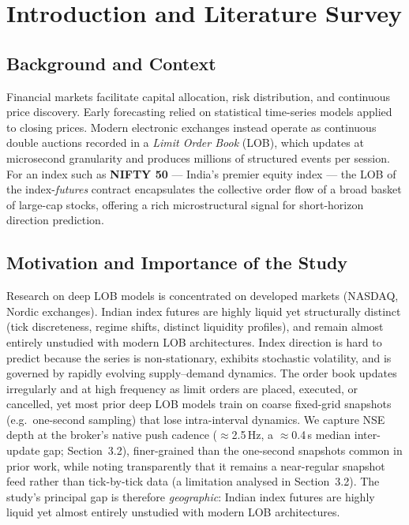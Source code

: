 \documentclass[11pt]{article}
\begin{document}
\section{Introduction and Literature Survey}

\subsection{Background and Context}
Financial markets facilitate capital allocation, risk distribution, and continuous price discovery.
Early forecasting relied on statistical time-series models applied to closing prices. Modern electronic
exchanges instead operate as continuous double auctions recorded in a \emph{Limit Order Book} (LOB),
which updates at microsecond granularity and produces millions of structured events per session. For an
index such as \textbf{NIFTY 50} --- India's premier equity index --- the LOB of the index-\emph{futures}
contract encapsulates the collective order flow of a broad basket of large-cap stocks, offering a rich
microstructural signal for short-horizon direction prediction.

\subsection{Motivation and Importance of the Study}
Research on deep LOB models is concentrated on developed markets (NASDAQ, Nordic exchanges). Indian index
futures are highly liquid yet structurally distinct (tick discreteness, regime shifts, distinct liquidity
profiles), and remain almost entirely unstudied with modern LOB architectures. Index direction is hard to
predict because the series is non-stationary, exhibits stochastic volatility, and is governed by rapidly
evolving supply--demand dynamics. The order book updates irregularly and at high frequency as limit orders
are placed, executed, or cancelled, yet most prior deep LOB models train on coarse fixed-grid snapshots
(e.g.\ one-second sampling) that lose intra-interval dynamics. We capture NSE depth at the broker's native
push cadence ($\approx$2.5\,Hz, a $\approx$0.4\,s median inter-update gap; Section~3.2), finer-grained than
the one-second snapshots common in prior work, while noting transparently that it remains a near-regular
snapshot feed rather than tick-by-tick data (a limitation analysed in Section~3.2). The study's principal gap
is therefore \emph{geographic}: Indian index futures are highly liquid yet almost entirely unstudied with
modern LOB architectures.
\end{document}
